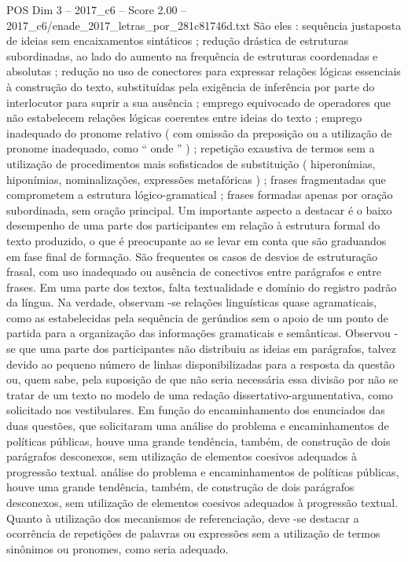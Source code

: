 \begin{textsample}{POS Dim 3 – 2017\_c6 – Score 2.00 – 2017\_c6/enade\_2017\_letras\_por\_281c81746d.txt}
São eles : sequência justaposta de ideias sem encaixamentos sintáticos ; redução drástica de estruturas subordinadas, ao lado do aumento na frequência de estruturas coordenadas e absolutas ; redução no uso de conectores para expressar relações lógicas essenciais à construção do texto, substituídas pela exigência de inferência por parte do interlocutor para suprir a sua ausência ; emprego equivocado de operadores que não estabelecem relações lógicas coerentes entre ideias do texto ; emprego inadequado do pronome relativo ( com omissão da preposição ou a utilização de pronome inadequado, como “ onde ” ) ; repetição exaustiva de termos sem a utilização de procedimentos mais sofisticados de substituição ( hiperonímias, hiponímias, nominalizações, expressões metafóricas ) ; frases fragmentadas que comprometem a estrutura lógico-gramatical ; frases formadas apenas por oração subordinada, sem oração principal.
Um importante aspecto a destacar é o baixo desempenho de uma parte dos participantes em relação à estrutura formal do texto produzido, o que é preocupante ao se levar em conta que são graduandos em fase final de formação.
São frequentes os casos de desvios de estruturação frasal, com uso inadequado ou ausência de conectivos entre parágrafos e entre frases.
Em uma parte dos textos, falta textualidade e domínio do registro padrão da língua.
Na verdade, observam -se relações linguísticas quase agramaticais, como as estabelecidas pela sequência de gerúndios sem o apoio de um ponto de partida para a organização das informações gramaticais e semânticas.
Observou -se que uma parte dos participantes não distribuiu as ideias em parágrafos, talvez devido ao pequeno número de linhas disponibilizadas para a resposta da questão ou, quem sabe, pela suposição de que não seria necessária essa divisão por não se tratar de um texto no modelo de uma redação dissertativo-argumentativa, como solicitado nos vestibulares.
Em função do encaminhamento dos enunciados das duas questões, que solicitaram uma análise do problema e encaminhamentos de políticas públicas, houve uma grande tendência, também, de construção de dois parágrafos desconexos, sem utilização de elementos coesivos adequados à progressão textual. análise do problema e encaminhamentos de políticas públicas, houve uma grande tendência, também, de construção de dois parágrafos desconexos, sem utilização de elementos coesivos adequados à progressão textual.
Quanto à utilização dos mecanismos de referenciação, deve -se destacar a ocorrência de repetições de palavras ou expressões sem a utilização de termos sinônimos ou pronomes, como seria adequado.

\end{textsample}
